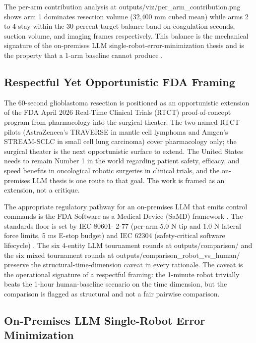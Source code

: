 The per-arm contribution analysis at
outputs/viz/per_arm_contribution.png shows arm 1 dominates resection
volume (32,400 mm cubed mean) while arms 2 to 4 stay within the 30
percent target balance band on coagulation seconds, suction volume,
and imaging frames respectively. This balance is the mechanical
signature of the on-premises LLM single-robot-error-minimization
thesis and is the property that a 1-arm baseline cannot produce
\cite{rosa-one-brain, Lefranc2014ROSAStereotaxy, kawchak_2026_19994945,
repo-robotic-surgeries}.

\subsection{Respectful Yet Opportunistic FDA Framing}
\label{sec:discussion-fda}

The 60-second glioblastoma resection is positioned as an
opportunistic extension of the FDA April 2026 Real-Time Clinical
Trials (RTCT) proof-of-concept program \cite{fda2026realtime} from
pharmacology into the surgical theater. The two named RTCT pilots
(AstraZeneca's TRAVERSE in mantle cell lymphoma and Amgen's
STREAM-SCLC in small cell lung carcinoma) cover pharmacology only;
the surgical theater is the next opportunistic surface to extend.
The United States needs to remain Number 1 in the world regarding
patient safety, efficacy, and speed benefits in oncological robotic
surgeries in clinical trials, and the on-premises LLM thesis is one
route to that goal. The work is framed as an extension, not a
critique.

The appropriate regulatory pathway for an on-premises LLM that emits
control commands is the FDA Software as a Medical Device (SaMD)
framework \cite{fda-samd}. The standards floor is set by IEC 80601-
2-77 (per-arm 5.0 N tip and 1.0 N lateral force limits, 5 ms E-stop
budget) \cite{iec-80601-2-77} and IEC 62304 (safety-critical
software lifecycle) \cite{iec-62304}. The six 4-entity LLM
tournament rounds at outputs/comparison/ and the six mixed
tournament rounds at outputs/comparison_robot_vs_human/ preserve the
structural-time-dimension caveat in every rationale. The caveat is
the operational signature of a respectful framing: the 1-minute
robot trivially beats the 1-hour human-baseline scenario on the
time dimension, but the comparison is flagged as structural and
not a fair pairwise comparison.

\subsection{On-Premises LLM Single-Robot Error Minimization}
\label{sec:discussion-llm}

